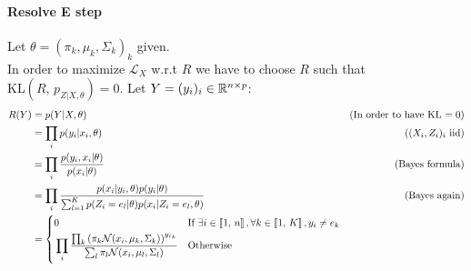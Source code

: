 \documentclass{article}
\begin{document}
\paragraph{Resolve E step} Let $\theta = {(\pi_k, \mu_k, \Sigma_k)}_k$ given.\vspace{10px}\\
In order to maximize $\mathcal{L}_X$ w.r.t $R$ we have to choose $R$ such that $\text{KL}(R,\, p_{Z|X, \theta}) = 0$. Let $Y = (y_i)_i \in \mathbb{R}^{n\times p}$:
\begin{equation*}
    \begin{aligned}
        R(Y)                       & = p(Y | X, \theta)                                                                                       & \text{(In order to have KL $= 0$)}                                                                                              \\
                                   & = \prod_i p(y_i|x_i, \theta)                                                                             & \text{($(X_i,Z_i)_i$ iid})                                                                                                      \\
                                   & = \prod_i \frac{p(y_i, x_i|\theta)}{p(x_i|\theta)}                                                       & \text{(Bayes formula)}                                                                                                          \\
                                   & = \prod_i \frac{p(x_i|y_i, \theta)p(y_i|\theta)}{\sum_{l=1}^K p(Z_i = e_l|\theta)p(x_i|Z_i=e_l, \theta)} & \text{(Bayes again)}                                                                                                            \\
                                   & = \vast\{
        \begin{aligned}
             & 0                                                                                                                                    &  & \text{If } \exists i \in \Inter{1}{n}, \forall k \in \Inter{1}{K}, y_i \neq e_k \\
             & \prod_i \frac{\prod_k \left(\pi_k\mathcal{N}(x_i, \mu_k, \Sigma_k)\right)^{{y_i}_k}}{\sum_l \pi_l \mathcal{N}(x_i, \mu_l, \Sigma_l)} &  & \text{Otherwise}                                                                \\
        \end{aligned} &                                                                                                                                                                                                                                            \\

\end{aligned}
\end{equation*}
\end{document}
